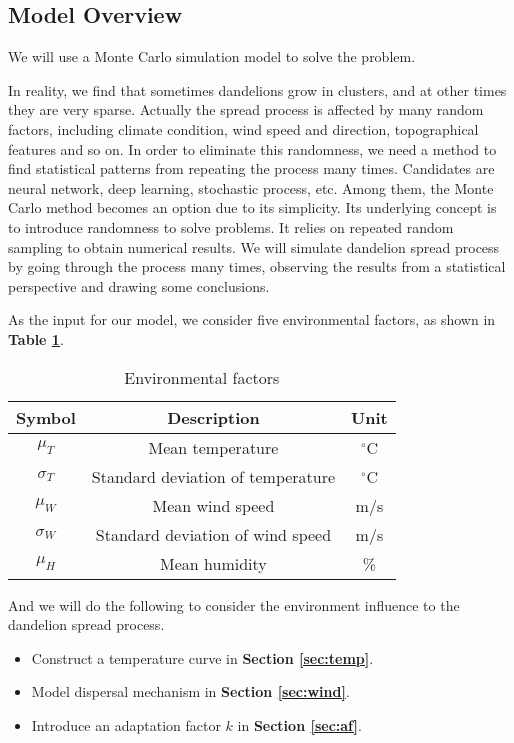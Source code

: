 \documentclass[12pt]{article}
\begin{document}
	
	

	
	\subsection{Model Overview}
		
		We will use a Monte Carlo simulation model to solve the problem.
		
		In reality, we find that sometimes dandelions grow in clusters, and at other times they are very sparse. Actually the spread process is affected by many random factors, including climate condition, wind speed and direction, topographical features and so on.  In order to eliminate this randomness, we need a method to find statistical patterns from repeating the process many times.  Candidates are neural network, deep learning, stochastic process, etc.  Among them, the Monte Carlo method becomes an option due to its simplicity.  Its underlying concept is to introduce randomness to solve problems.   It relies on repeated random sampling to obtain numerical results.  We will simulate dandelion spread process by going through the process many times, observing the results from a statistical perspective and drawing some conclusions.
		
		As the input for our model, we consider five environmental factors, as shown in \textbf{Table \ref{tb:vars}}.  
		
		{
			\fontsize{10}{14}\selectfont
			{
				\begin{longtable}{ccc}
					\caption{Environmental factors}
					\label{tb:vars}\\
					\toprule
					Symbol&Description&Unit\\
					\toprule
					$\mu_T$&Mean temperature&$^\circ$C\\
					$\sigma_T$&Standard deviation of temperature&$^\circ$C\\
					$\mu_W$&Mean wind speed&m/s\\
					$\sigma_W$&Standard deviation of wind speed&m/s\\
					$\mu_H$&Mean humidity&\%\\
					\bottomrule
				\end{longtable}
			}
		}
		
		And we will do the following to consider the environment influence to the dandelion spread process.
		
		\begin{itemize}
			\vspace{-0.5cm}
			\item Construct a temperature curve in \textbf{Section \ref{sec:temp}}.  
			
			\vspace{-0.2cm}
			\item Model dispersal mechanism in \textbf{Section \ref{sec:wind}}.
			
			\vspace{-0.2cm}
			\item Introduce an adaptation factor $k$ in \textbf{Section \ref{sec:af}}.  
		
		\end{itemize}
	
\end{document}
